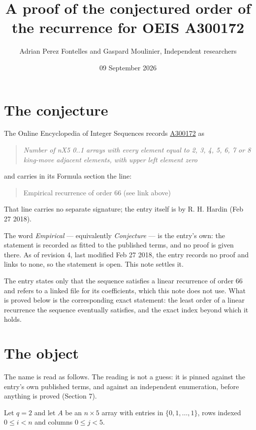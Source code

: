 \documentclass[11pt]{article}
\title{A proof of the conjectured order of the recurrence for OEIS A300172}
\author{Adrian Perez Fontelles and Gaspard Moulinier, Independent researchers}
\date{09 September 2026}
\theoremstyle{definition}
\begin{document}
\maketitle
\section{The conjecture}

The Online Encyclopedia of Integer Sequences records \href{https://oeis.org/A300172}{A300172} as

\begin{quote}\itshape Number of nX5 0..1 arrays with every element equal to 2, 3, 4, 5, 6, 7 or 8 king-move adjacent elements, with upper left element zero\end{quote}

and carries in its Formula section the line:

\begin{quote}\ttfamily Empirical recurrence of order 66 (see link above)\end{quote}

That line carries no separate signature; the entry itself is by R. H. Hardin (Feb 27 2018).

The word {\itshape Empirical} --- equivalently {\itshape Conjecture} --- is the entry's own: the statement is recorded as fitted to the published terms, and no proof is given there. As of revision 4, last modified Feb 27 2018, the entry records no proof and links to none, so the statement is open. This note settles it.

The entry states only that the sequence satisfies a linear recurrence of order $66$ and refers to a linked file for its coefficients, which this note does not use. What is proved below is the corresponding exact statement: the least order of a linear recurrence the sequence eventually satisfies, and the exact index beyond which it holds.

\section{The object}

The name is read as follows. The reading is not a guess: it is pinned against the entry's own published terms, and against an independent enumeration, before anything is proved (Section 7).

Let $q = 2$ and let $A$ be an $n \times 5$ array with entries in $\{0,1,\dots,1\}$, rows indexed $0 \le i < n$ and columns $0 \le j < 5$.
\end{document}
